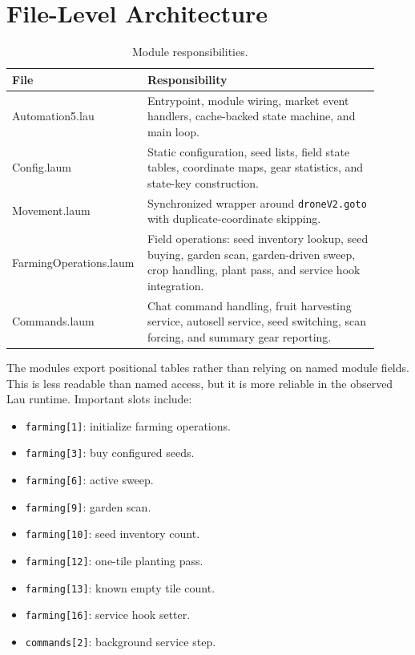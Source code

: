 \documentclass[11pt]{article}
\begin{document}
\section{File-Level Architecture}

\begin{table}[htbp]
\centering
\begin{tabular}{>{\ttfamily}p{0.29\linewidth} p{0.62\linewidth}}
\toprule
File & Responsibility \\
\midrule
Automation5.lau & Entrypoint, module wiring, market event handlers, cache-backed state machine, and main loop. \\
Config.laum & Static configuration, seed lists, field state tables, coordinate maps, gear statistics, and state-key construction. \\
Movement.laum & Synchronized wrapper around \texttt{droneV2.goto} with duplicate-coordinate skipping. \\
FarmingOperations.laum & Field operations: seed inventory lookup, seed buying, garden scan, garden-driven sweep, crop handling, plant pass, and service hook integration. \\
Commands.laum & Chat command handling, fruit harvesting service, autosell service, seed switching, scan forcing, and summary gear reporting. \\
\bottomrule
\end{tabular}
\caption{Module responsibilities.}
\end{table}

The modules export positional tables rather than relying on named module
fields. This is less readable than named access, but it is more reliable in the
observed Lau runtime. Important slots include:

\begin{itemize}
    \item \texttt{farming[1]}: initialize farming operations.
    \item \texttt{farming[3]}: buy configured seeds.
    \item \texttt{farming[6]}: active sweep.
    \item \texttt{farming[9]}: garden scan.
    \item \texttt{farming[10]}: seed inventory count.
    \item \texttt{farming[12]}: one-tile planting pass.
    \item \texttt{farming[13]}: known empty tile count.
    \item \texttt{farming[16]}: service hook setter.
    \item \texttt{commands[2]}: background service step.
\end{itemize}
\end{document}
